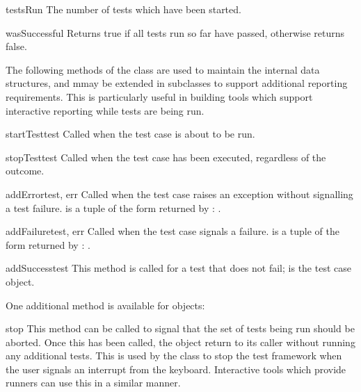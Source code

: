 \begin{memberdesc}[TestResult]{testsRun}
  The number of tests which have been started.
\end{memberdesc}

\begin{methoddesc}[TestResult]{wasSuccessful}{}
  Returns true if all tests run so far have passed, otherwise returns
  false.
\end{methoddesc}


The following methods of the  class are used to
maintain the internal data structures, and mmay be extended in
subclasses to support additional reporting requirements.  This is
particularly useful in building tools which support interactive
reporting while tests are being run.

\begin{methoddesc}[TestResult]{startTest}{test}
  Called when the test case  is about to be run.
\end{methoddesc}

\begin{methoddesc}[TestResult]{stopTest}{test}
  Called when the test case  has been executed, regardless
  of the outcome.
\end{methoddesc}

\begin{methoddesc}[TestResult]{addError}{test, err}
  Called when the test case  raises an exception without
  signalling a test failure.   is a tuple of the form
  returned by :  .
\end{methoddesc}

\begin{methoddesc}[TestResult]{addFailure}{test, err}
  Called when the test case  signals a failure.
   is a tuple of the form returned by
  :  .
\end{methoddesc}

\begin{methoddesc}[TestResult]{addSuccess}{test}
  This method is called for a test that does not fail;  is
  the test case object.
\end{methoddesc}


One additional method is available for  objects:

\begin{methoddesc}[TestResult]{stop}{}
  This method can be called to signal that the set of tests being run
  should be aborted.  Once this has been called, the
   object return to its caller without running any
  additional tests.  This is used by the  class
  to stop the test framework when the user signals an interrupt from
  the keyboard.  Interactive tools which provide runners can use this
  in a similar manner.
\end{methoddesc}


